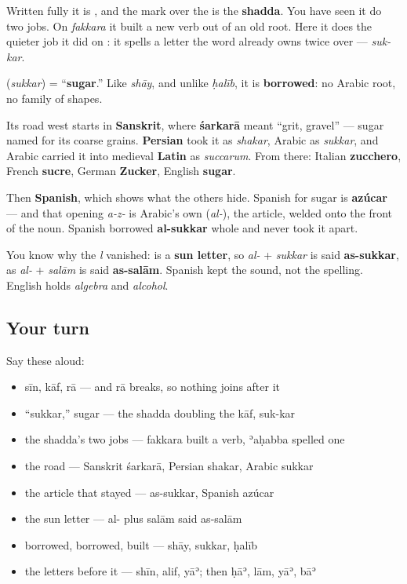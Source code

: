 Written fully it is \textbf{}, and the mark over the \textbf{} is the \textbf{shadda}. You have seen it do two jobs. On \emph{fakkara} it built a new verb out of an old root. Here it does the quieter job it did on \textbf{}: it spells a letter the word already owns twice over — \emph{suk-kar}.

\begin{cousinweb}
\textbf{} (\emph{sukkar}) = \textquotedblleft{}\textbf{sugar}.\textquotedblright{} Like \emph{shāy}, and unlike \emph{ḥalīb}, it is \textbf{borrowed}: no Arabic root, no family of shapes.

Its road west starts in \textbf{Sanskrit}, where \textbf{śarkarā} meant \textquotedblleft{}grit, gravel\textquotedblright{} — sugar named for its coarse grains. \textbf{Persian} took it as \emph{shakar}, Arabic as \emph{sukkar}, and Arabic carried it into medieval \textbf{Latin} as \emph{succarum}. From there: Italian \textbf{zucchero}, French \textbf{sucre}, German \textbf{Zucker}, English \textbf{sugar}.

Then \textbf{Spanish}, which shows what the others hide. Spanish for sugar is \textbf{azúcar} — and that opening \emph{a-z-} is Arabic's own \textbf{} (\emph{al-}), the article, welded onto the front of the noun. Spanish borrowed \textbf{al-sukkar} whole and never took it apart.

You know why the \emph{l} vanished: \textbf{} is a \textbf{sun letter}, so \emph{al-} + \emph{sukkar} is said \textbf{as-sukkar}, as \emph{al-} + \emph{salām} is said \textbf{as-salām}. Spanish kept the sound, not the spelling. English holds \emph{algebra} and \emph{alcohol}.
\end{cousinweb}

\subsection*{Your turn}
Say these aloud:

\begin{itemize}
\raggedright
  \item sīn, kāf, rā — and rā breaks, so nothing joins after it
  \item \textquotedblleft{}sukkar,\textquotedblright{} sugar — the shadda doubling the kāf, suk-kar
  \item the shadda's two jobs — fakkara built a verb, ʾaḥabba spelled one
  \item the road — Sanskrit śarkarā, Persian shakar, Arabic sukkar
  \item the article that stayed — as-sukkar, Spanish azúcar
  \item the sun letter — al- plus salām said as-salām
  \item borrowed, borrowed, built — shāy, sukkar, ḥalīb
  \item the letters before it — shīn, alif, yāʾ; then ḥāʾ, lām, yāʾ, bāʾ
\end{itemize}

